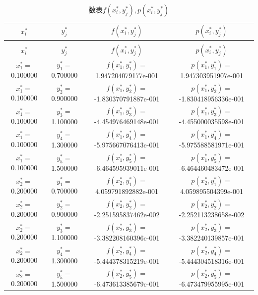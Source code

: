 \begin{longtable}{cccc}

\toprule
 $x_i^{\ast}$ & $y_j^{\ast}$ & $f(x_i^{\ast},y_j^{\ast})$&$p(x_i^{\ast},y_j^{\ast})$\\
\midrule
\endhead

\caption{数表$f({x_i^{\ast}},{y_j^{\ast}}),p({x_i^{\ast}},{y_j^{\ast}})$}\\
\toprule
 $x_i^{\ast}$ & $y_j^{\ast}$ & $f(x_i^{\ast},y_j^{\ast})$&$p(x_i^{\ast},y_j^{\ast})$\\
 \midrule
\endfirsthead
\bottomrule
\endfoot
\bottomrule
\endlastfoot

$x_{1}^{\ast}=$0.100000 & $y_{1}^{\ast}=$0.700000 & $f(x_{1}^{\ast},y_{1}^{\ast})=$1.947204079177e-001 &$p(x_{1}^{\ast},y_{1}^{\ast})=$1.947303951907e-001 \\
$x_{1}^{\ast}=$0.100000 & $y_{2}^{\ast}=$0.900000 & $f(x_{1}^{\ast},y_{2}^{\ast})=$-1.830370791887e-001 &$p(x_{1}^{\ast},y_{2}^{\ast})=$-1.830418956336e-001 \\
$x_{1}^{\ast}=$0.100000 & $y_{3}^{\ast}=$1.100000 & $f(x_{1}^{\ast},y_{3}^{\ast})=$-4.454976469148e-001 &$p(x_{1}^{\ast},y_{3}^{\ast})=$-4.455000035598e-001 \\
$x_{1}^{\ast}=$0.100000 & $y_{4}^{\ast}=$1.300000 & $f(x_{1}^{\ast},y_{4}^{\ast})=$-5.975667076413e-001 &$p(x_{1}^{\ast},y_{4}^{\ast})=$-5.975588581971e-001 \\
$x_{1}^{\ast}=$0.100000 & $y_{5}^{\ast}=$1.500000 & $f(x_{1}^{\ast},y_{5}^{\ast})=$-6.464595939011e-001 &$p(x_{1}^{\ast},y_{5}^{\ast})=$-6.464460483472e-001 \\
$x_{2}^{\ast}=$0.200000 & $y_{1}^{\ast}=$0.700000 & $f(x_{2}^{\ast},y_{1}^{\ast})=$4.059791892882e-001 &$p(x_{2}^{\ast},y_{1}^{\ast})=$4.059895504399e-001 \\
$x_{2}^{\ast}=$0.200000 & $y_{2}^{\ast}=$0.900000 & $f(x_{2}^{\ast},y_{2}^{\ast})=$-2.251595837462e-002 &$p(x_{2}^{\ast},y_{2}^{\ast})=$-2.252113238658e-002 \\
$x_{2}^{\ast}=$0.200000 & $y_{3}^{\ast}=$1.100000 & $f(x_{2}^{\ast},y_{3}^{\ast})=$-3.382208160396e-001 &$p(x_{2}^{\ast},y_{3}^{\ast})=$-3.382240139857e-001 \\
$x_{2}^{\ast}=$0.200000 & $y_{4}^{\ast}=$1.300000 & $f(x_{2}^{\ast},y_{4}^{\ast})=$-5.444378315219e-001 &$p(x_{2}^{\ast},y_{4}^{\ast})=$-5.444304518316e-001 \\
$x_{2}^{\ast}=$0.200000 & $y_{5}^{\ast}=$1.500000 & $f(x_{2}^{\ast},y_{5}^{\ast})=$-6.473613385679e-001 &$p(x_{2}^{\ast},y_{5}^{\ast})=$-6.473479955995e-001 \\

\end{longtable}
